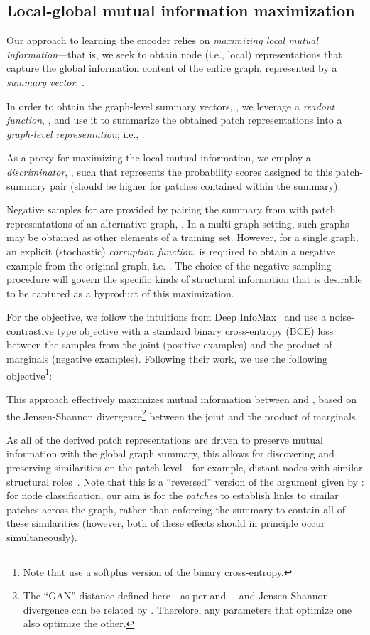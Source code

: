 \documentclass{article} \usepackage{iclr2019_conference,times}
\begin{document}
\subsection{Local-global mutual information maximization}

Our approach to learning the encoder relies on \emph{maximizing local mutual information}---that is, we seek to obtain node (i.e., local) representations that capture the global information content of the entire graph, represented by a \emph{summary vector}, . 

In order to obtain the graph-level summary vectors, , we leverage a \emph{readout function}, , and use it to summarize the obtained patch representations into a \emph{graph-level representation}; i.e., .

As a proxy for maximizing the local mutual information, we employ a \emph{discriminator}, , such that  represents the probability scores assigned to this patch-summary pair (should be higher for patches contained within the summary).

Negative samples for  are provided by pairing the summary  from  with patch representations  of an alternative graph, . In a multi-graph setting, such graphs may be obtained as other elements of a training set. However, for a single graph, an explicit (stochastic) \emph{corruption function},  is required to obtain a negative example from the original graph, i.e. . The choice of the negative sampling procedure will govern the specific kinds of structural information that is desirable to be captured as a byproduct of this maximization.

For the objective, we follow the intuitions from Deep InfoMax~\citep[DIM,][]{hjelm2018learning} and use a noise-contrastive type objective with a standard binary cross-entropy (BCE) loss between the samples from the joint (positive examples) and the product of marginals (negative examples). Following their work, we use the following objective\footnote{Note that \citet{hjelm2018learning} use a softplus version of the binary cross-entropy.}:
 
This approach effectively maximizes mutual information between  and , based on the Jensen-Shannon divergence\footnote{The ``GAN'' distance defined here---as per \cite{goodfellow2014generative} and \cite{nowozin2016f}---and Jensen-Shannon divergence can be related by . Therefore, any parameters that optimize one also optimize the other.} between the joint and the product of marginals.

As all of the derived patch representations are driven to preserve mutual information with the global graph summary, this allows for discovering and preserving similarities on the patch-level---for example, distant nodes with similar structural roles~\citep[which are known to be a strong predictor for many node classification tasks;][]{donnat2018}. Note that this is a ``reversed'' version of the argument given by \citet{hjelm2018learning}: for node classification, our aim is for the \emph{patches} to establish links to similar patches across the graph, rather than enforcing the summary to contain all of these similarities (however, both of these effects should in principle occur simultaneously).
\end{document}
